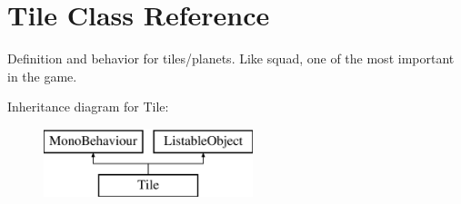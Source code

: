 \hypertarget{class_tile}{}\section{Tile Class Reference}
\label{class_tile}


Definition and behavior for tiles/planets. Like squad, one of the most important in the game.  


Inheritance diagram for Tile\+:\begin{figure}[H]
\begin{center}
\leavevmode
\includegraphics[height=2.000000cm]{class_tile}
\end{center}
\end{figure}
